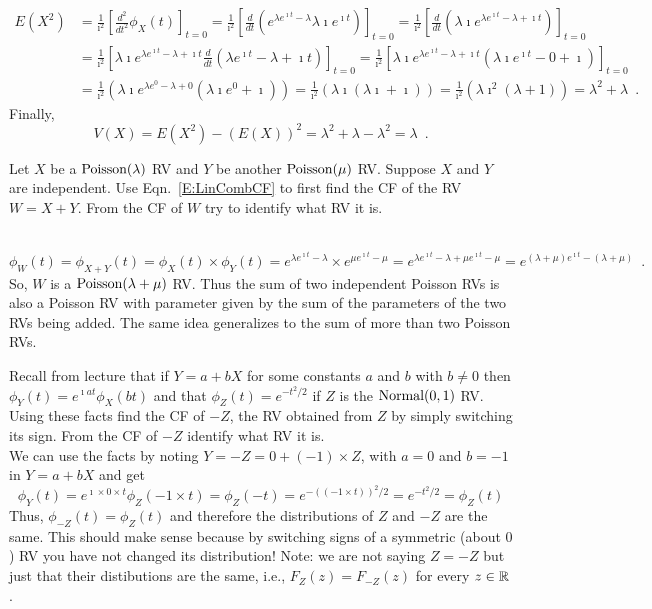 \begin{ExerciseList}
\begin{align*}
E(X^2) 
&= \frac{1}{\imath^2} \left[ \frac{d^2}{dt^2} \phi_X(t) \right]_{t=0}
= \frac{1}{\imath^2} \left[ \frac{d}{dt} \left( e^{\lambda e^{\imath t} - \lambda} \lambda \imath e^{\imath t} \right) \right]_{t=0}
= \frac{1}{\imath^2} \left[ \frac{d}{dt} \left( \lambda \imath e^{\lambda e^{\imath t} - \lambda + \imath t} \right) \right]_{t=0}\\
&= \frac{1}{\imath^2} \left[ \lambda \imath e^{\lambda e^{\imath t} - \lambda + \imath t} \frac{d}{dt} \left( \lambda e^{\imath t} - \lambda + \imath t \right) \right]_{t=0}
= \frac{1}{\imath^2} \left[ \lambda \imath e^{\lambda e^{\imath t} - \lambda + \imath t} \left( \lambda \imath e^{\imath t} - 0 + \imath \right) \right]_{t=0}\\
&= \frac{1}{\imath^2} \left( \lambda \imath e^{\lambda e^{0} - \lambda + 0} \left( \lambda \imath e^{0}  + \imath \right) \right)
= \frac{1}{\imath^2} \left( \lambda \imath \left( \lambda \imath  + \imath \right) \right)
= \frac{1}{\imath^2} \left( \lambda \imath^2 \left( \lambda  + 1 \right) \right)
= \lambda^2 + \lambda \enspace .
\end{align*}
Finally,
\[
V(X) = E(X^2) - (E(X))^2 = \lambda^2 + \lambda - \lambda^2 = \lambda \enspace .
\]
\ee

\Exercise
Let $X$ be a $\mbox{{\rm Poisson}}(\lambda)$ RV and $Y$ be another $\mbox{{\rm Poisson}}(\mu)$ RV.  
Suppose $X$ and $Y$ are independent.
Use Eqn.~\eqref{E:LinCombCF} to first find the CF of the RV $W=X+Y$.  
From the CF of $W$ try to identify what RV it is. 

\Answer
~\\
\[
\phi_{W}(t) = \phi_{X+Y}(t) = \phi_X(t) \times \phi_Y(t) 
= e^{\lambda e^{\imath t}-\lambda} \times e^{\mu e^{\imath t}-\mu}
= e^{\lambda e^{\imath t}-\lambda + \mu e^{\imath t}-\mu} 
= e^{(\lambda+\mu) e^{\imath t} -(\lambda+\mu)} \enspace . 
\]
So, $W$ is a $\mbox{{\rm Poisson}}(\lambda+\mu)$ RV. Thus the sum of two independent Poisson RVs is also a Poisson RV with parameter given by the sum of the parameters of the two RVs being added.  The same idea generalizes to the sum of more than two Poisson RVs. 

\Exercise
Recall from lecture that if $Y=a+bX$ for some constants $a$ and $b$ with $b\neq 0$ then $\phi_Y(t) = e^{\imath a t} \phi_X(bt)$ and that $\phi_Z(t)=e^{-t^2/2}$ if $Z$ is the $\mbox{{\rm Normal}}(0,1)$ RV.  
Using these facts find the CF of $-Z$, the RV obtained from $Z$ by simply switching its sign.
From the CF of $-Z$ identify what RV it is.
\Answer
~\\
We can use the facts by noting $Y=-Z = 0 + (-1) \times Z$, with $a=0$ and $b=-1$ in $Y=a+bX$ and get
\[
\phi_{Y}(t) = e^{\imath \times 0 \times t} \phi_Z(-1 \times t) = \phi_Z(-t) = e^{-((-1 \times t))^2/2} = e^{-t^2/2} = \phi_Z(t)
\]
Thus, $\phi_{-Z}(t) = \phi_Z(t)$ and therefore the distributions of $Z$ and $-Z$ are the same. This should make sense because by switching signs of a symmetric (about $0$) RV you have not changed its distribution!  Note: we are not saying $Z=-Z$ but just that their distibutions are the same, i.e., $F_Z(z) = F_{-Z}(z)$ for every $z \in \mathbb{R}$.


\end{ExerciseList}
\newpage
